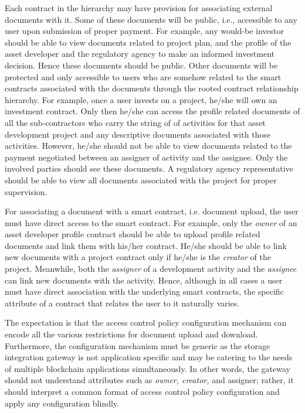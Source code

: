 \documentclass[conference]{IEEEtran}
\begin{document}
Each contract in the hierarchy may have provision for associating external documents with it. Some of these documents will be public, i.e., accessible to any user upon submission of proper payment. For example, any would-be investor should be able to view documents related to project plan, and the profile of the asset developer and the regulatory agency to make an informed investment decision. Hence these documents should be public. Other documents will be protected and only accessible to users who are somehow related to the smart contracts associated with the documents through the rooted contract relationship hierarchy. For example, once a user invests on a project, he/she will own an investment contract. Only then he/she can access the profile related documents of all the sub-contractors who carry the string of of activities for that asset development project and any descriptive documents associated with those activities. However, he/she should not be able to view documents related to the payment negotiated between an assigner of activity and the assignee. Only the involved parties should see these documents. A regulatory agency representative should be able to view all documents associated with the project for proper supervision.    

For associating a document with a smart contract, i.e. document upload, the user must have direct access to the smart contract. For example, only the {\it owner} of an asset developer profile contract should be able to upload profile related documents and link them with his/her contract. He/she should be able to link new documents with a project contract only if he/she is the {\it creator} of the project. Meanwhile, both the {\it assigner} of a development activity and the {\it assignee} can link new documents with the activity. Hence, although in all cases a user must have direct association with the underlying smart contracts, the specific attribute of a contract that relates the user to it naturally varies.   

The expectation is that the access control policy configuration mechanism can encode all the various restrictions for document upload and download. Furthermore, the configuration mechanism must be generic as the storage integration gateway is not application specific and may be catering to the needs of multiple blockchain applications simultaneously. In other words, the gateway should not understand attributes such as {\it owner, creator,} and {assigner}; rather, it should interpret a common format of access control policy configuration and apply any configuration blindly.      
 
\end{document}
